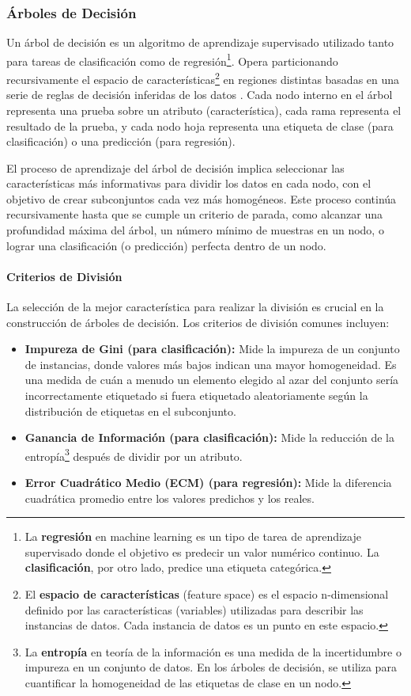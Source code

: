 \subsubsection{Árboles de Decisión}
Un árbol de decisión es un algoritmo de aprendizaje supervisado utilizado tanto para tareas de clasificación como de regresión\footnote{La \textbf{regresión} en machine learning es un tipo de tarea de aprendizaje supervisado donde el objetivo es predecir un valor numérico continuo.
La \textbf{clasificación}, por otro lado, predice una etiqueta categórica.}.
Opera particionando recursivamente el espacio de características\footnote{El \textbf{espacio de características} (feature space) es el espacio n-dimensional definido por las características (variables) utilizadas para describir las instancias de datos.
Cada instancia de datos es un punto en este espacio.} en regiones distintas basadas en una serie de reglas de decisión inferidas de los datos \parencite{quinlan1986induction}.
Cada nodo interno en el árbol representa una prueba sobre un atributo (característica), cada rama representa el resultado de la prueba, y cada nodo hoja representa una etiqueta de clase (para clasificación) o una predicción (para regresión).

El proceso de aprendizaje del árbol de decisión implica seleccionar las características más informativas para dividir los datos en cada nodo, con el objetivo de crear subconjuntos cada vez más homogéneos.
Este proceso continúa recursivamente hasta que se cumple un criterio de parada, como alcanzar una profundidad máxima del árbol, un número mínimo de muestras en un nodo, o lograr una clasificación (o predicción) perfecta dentro de un nodo.

\paragraph{Criterios de División}
La selección de la mejor característica para realizar la división es crucial en la construcción de árboles de decisión.
Los criterios de división comunes incluyen:

\begin{itemize}
    \item \textbf{Impureza de Gini (para clasificación):} Mide la impureza de un conjunto de instancias, donde valores más bajos indican una mayor homogeneidad.
Es una medida de cuán a menudo un elemento elegido al azar del conjunto sería incorrectamente etiquetado si fuera etiquetado aleatoriamente según la distribución de etiquetas en el subconjunto.
    \item \textbf{Ganancia de Información (para clasificación):} Mide la reducción de la entropía\footnote{La \textbf{entropía} en teoría de la información es una medida de la incertidumbre o impureza en un conjunto de datos.
En los árboles de decisión, se utiliza para cuantificar la homogeneidad de las etiquetas de clase en un nodo.} después de dividir por un atributo.
    \item \textbf{Error Cuadrático Medio (ECM) (para regresión):} Mide la diferencia cuadrática promedio entre los valores predichos y los reales.
\end{itemize}

